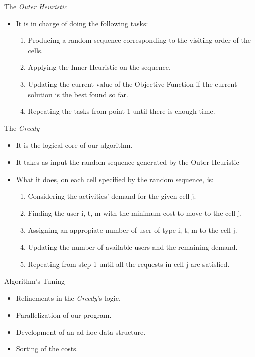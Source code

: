 \documentclass[]{beamer}
\newcommand{\hl}[1]{{\color[HTML]{26BF18} #1}}
\begin{document}
\begin{frame}{\fontUbuntu The \textit{Outer Heuristic}}
	\begin{itemize}
		\item It is in charge of doing the following tasks:
			\begin{enumerate}
				\item Producing a \hl{random sequence} corresponding to the visiting order of the cells.
				\item Applying the \hl{Inner Heuristic} on the sequence.
				\item Updating the current value of the \hl{Objective Function} if the current solution is the best found so far.
				\item \hl{Repeating} the tasks from point \hl{1} until there is enough time.
			\end{enumerate}
	\end{itemize}
\end{frame}

\begin{frame}{\fontUbuntu The \textit{Greedy}}
	\begin{itemize}
		\item It is the \hl{logical core} of our algorithm.
		\item It takes as input the random sequence generated by the \hl{Outer Heuristic}
		\item What it does, on each cell specified by the random sequence, is:
			\begin{enumerate}
				\item Considering the activities' demand for the given cell j.
				\item Finding the user i, t, m with the \hl{minimum cost} to move to the cell j.
				\item Assigning an appropiate number of user of type i, t, m to the cell j.
				\item Updating the number of available users and the remaining demand.
				\item \hl{Repeating} from step \hl{1} until all the requests in cell j are satisfied.
			\end{enumerate}
	\end{itemize}
\end{frame}

\begin{frame}{\fontUbuntu Algorithm's Tuning}
	\begin{itemize}
		\item \hl{Refinements} in the \textit{Greedy}'s logic.
		\item \hl{Parallelization} of our program.
		\item Development of an \hl{ad hoc data structure}.
		\item \hl{Sorting} of the costs.
	\end{itemize}
\end{frame}
\end{document}
